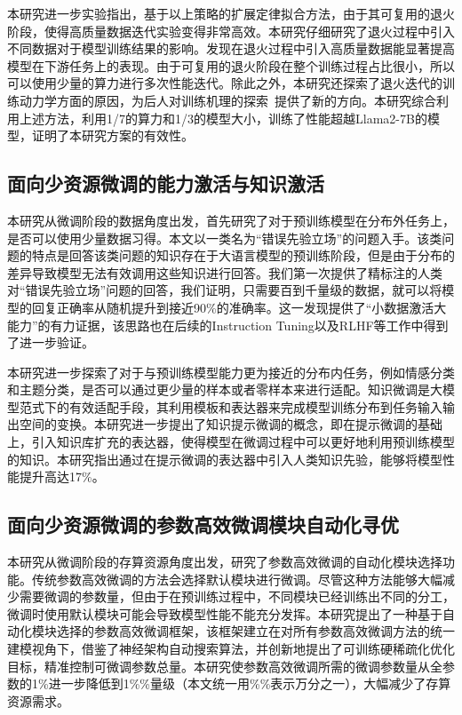 本研究进一步实验指出，基于以上策略的扩展定律拟合方法，由于其可复用的退火阶段，使得高质量数据迭代实验变得非常高效。本研究仔细研究了退火过程中引入不同数据对于模型训练结果的影响。发现在退火过程中引入高质量数据能显著提高模型在下游任务上的表现。由于可复用的退火阶段在整个训练过程占比很小，所以可以使用少量的算力进行多次性能迭代。除此之外，本研究还探索了退火迭代的训练动力学方面的原因，为后人对训练机理的探索~\cite{wen2024understanding}提供了新的方向。本研究综合利用上述方法，利用1/7的算力和1/3的模型大小，训练了性能超越Llama2-7B的模型，证明了本研究方案的有效性。

\subsection{面向少资源微调的能力激活与知识激活}
本研究从微调阶段的数据角度出发，首先研究了对于预训练模型在分布外任务上，是否可以使用少量数据习得。本文以一类名为“错误先验立场”的问题入手。该类问题的特点是回答该类问题的知识存在于大语言模型的预训练阶段，但是由于分布的差异导致模型无法有效调用这些知识进行回答。我们第一次提供了精标注的人类对“错误先验立场”问题的回答，我们证明，只需要百到千量级的数据，就可以将模型的回复正确率从随机提升到接近90\%的准确率。这一发现提供了“小数据激活大能力”的有力证据，该思路也在后续的Instruction Tuning以及RLHF等工作中得到了进一步验证。

本研究进一步探索了对于与预训练模型能力更为接近的分布内任务，例如情感分类和主题分类，是否可以通过更少量的样本或者零样本来进行适配。知识微调是大模型范式下的有效适配手段，其利用模板和表达器来完成模型训练分布到任务输入输出空间的变换。本研究进一步提出了知识提示微调的概念，即在提示微调的基础上，引入知识库扩充的表达器，使得模型在微调过程中可以更好地利用预训练模型的知识。本研究指出通过在提示微调的表达器中引入人类知识先验，能够将模型性能提升高达17\%。

\subsection{面向少资源微调的参数高效微调模块自动化寻优}
本研究从微调阶段的存算资源角度出发，研究了参数高效微调的自动化模块选择功能。传统参数高效微调的方法会选择默认模块进行微调。尽管这种方法能够大幅减少需要微调的参数量，但由于在预训练过程中，不同模块已经训练出不同的分工，微调时使用默认模块可能会导致模型性能不能充分发挥。本研究提出了一种基于自动化模块选择的参数高效微调框架，该框架建立在对所有参数高效微调方法的统一建模视角下，借鉴了神经架构自动搜索算法，并创新地提出了可训练硬稀疏化优化目标，精准控制可微调参数总量。本研究使参数高效微调所需的微调参数量从全参数的1\%进一步降低到1\%\%量级（本文统一用\%\%表示万分之一），大幅减少了存算资源需求。



